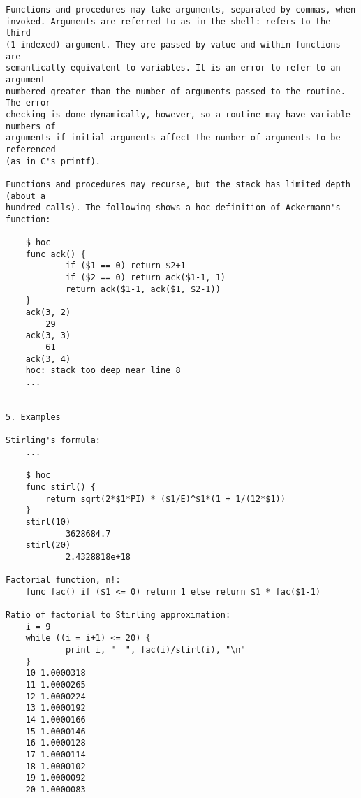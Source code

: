 \begin{verbatim}
Functions and procedures may take arguments, separated by commas, when
invoked. Arguments are referred to as in the shell: refers to the third
(1-indexed) argument. They are passed by value and within functions are
semantically equivalent to variables. It is an error to refer to an argument
numbered greater than the number of arguments passed to the routine. The error
checking is done dynamically, however, so a routine may have variable numbers of
arguments if initial arguments affect the number of arguments to be referenced
(as in C's printf).

Functions and procedures may recurse, but the stack has limited depth (about a
hundred calls). The following shows a hoc definition of Ackermann's function:

    $ hoc
    func ack() {
            if ($1 == 0) return $2+1
            if ($2 == 0) return ack($1-1, 1)
            return ack($1-1, ack($1, $2-1))
    }
    ack(3, 2)
        29
    ack(3, 3)
        61
    ack(3, 4)
    hoc: stack too deep near line 8
    ...


5. Examples

Stirling's formula:
    ...

    $ hoc
    func stirl() {
        return sqrt(2*$1*PI) * ($1/E)^$1*(1 + 1/(12*$1))
    }
    stirl(10)
            3628684.7
    stirl(20)
            2.4328818e+18

Factorial function, n!:
    func fac() if ($1 <= 0) return 1 else return $1 * fac($1-1)

Ratio of factorial to Stirling approximation:
    i = 9
    while ((i = i+1) <= 20) {
            print i, "  ", fac(i)/stirl(i), "\n"
    }
    10 1.0000318 
    11 1.0000265 
    12 1.0000224 
    13 1.0000192 
    14 1.0000166 
    15 1.0000146 
    16 1.0000128 
    17 1.0000114 
    18 1.0000102 
    19 1.0000092 
    20 1.0000083 

\end{verbatim}
